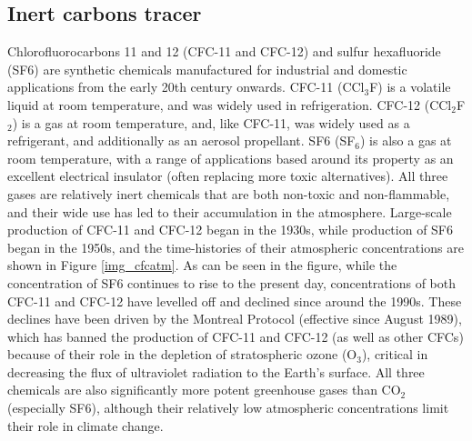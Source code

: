 \documentclass[../main/TOP_manual]{subfiles}
\begin{document}
\subsection{Inert carbons tracer}

%

Chlorofluorocarbons 11 and 12 (CFC-11 and CFC-12) and sulfur hexafluoride (SF6) are synthetic chemicals manufactured for industrial and domestic applications from the early 20th century onwards.
CFC-11 (CCl$_{3}$F) is a volatile liquid at room temperature, and was widely used in refrigeration.
CFC-12 (CCl$_{2}$F$_{2}$) is a gas at room temperature, and, like CFC-11, was widely used as a refrigerant,
and additionally as an aerosol propellant.
SF6 (SF$_{6}$) is also a gas at room temperature, with a range of applications based around its property as an excellent electrical insulator (often replacing more toxic alternatives).
All three gases are relatively inert chemicals that are both non-toxic and non-flammable, and their wide use has led to their accumulation in the atmosphere.
Large-scale production of CFC-11 and CFC-12 began in the 1930s, while production of SF6 began in the 1950s, and the time-histories of their atmospheric concentrations are shown in Figure \autoref{img_cfcatm}.
As can be seen in the figure, while the concentration of SF6 continues to rise to the present day, concentrations of both CFC-11 and CFC-12 have levelled off and declined since around the 1990s.
These declines have been driven by the Montreal Protocol (effective since August 1989), which has banned the production of CFC-11 and CFC-12 (as well as other CFCs) because of their role in the depletion of
stratospheric ozone (O$_{3}$), critical in decreasing the flux of ultraviolet radiation to the Earth's surface. All three chemicals are also  significantly more potent greenhouse gases
than CO$_{2}$ (especially SF6), although their relatively low atmospheric concentrations limit their role in climate change. \\
\end{document}
